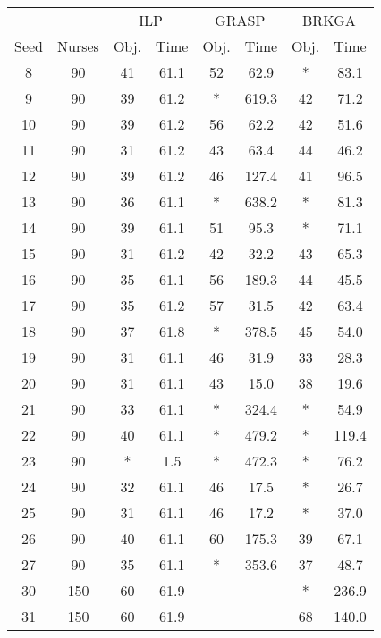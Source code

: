 \documentclass[12pt,a4paper]{article}
\begin{document}
\begin{table}[ht]
\centering
\begin{tabular}{cccccccc}
\toprule
&&\multicolumn{2}{c}{ILP}
& \multicolumn{2}{c}{GRASP}
& \multicolumn{2}{c}{BRKGA} \\
Seed & Nurses & Obj. & Time & Obj. & Time  & Obj. & Time  \\
\midrule
	8  &     90 &  41  & 61.1 &  52  &  62.9 &  *   &  83.1 \\
	9  &     90 &  39  & 61.2 &   *  & 619.3 &  42  &  71.2 \\
	10 &     90 &  39  & 61.2 &  56  &  62.2 &  42  &  51.6 \\
	11 &     90 &  31  & 61.2 &  43  &  63.4 &  44  &  46.2 \\
	12 &     90 &  39  & 61.2 &  46  & 127.4 &  41  &  96.5 \\
	13 &     90 &  36  & 61.1 &   *  & 638.2 &  *   &  81.3 \\
	14 &     90 &  39  & 61.1 &  51  &  95.3 &  *   &  71.1 \\
	15 &     90 &  31  & 61.2 &  42  &  32.2 &  43  &  65.3 \\
	16 &     90 &  35  & 61.1 &  56  & 189.3 &  44  &  45.5 \\
	17 &     90 &  35  & 61.2 &  57  &  31.5 &  42  &  63.4 \\
	18 &     90 &  37  & 61.8 &   *  & 378.5 &  45  &  54.0 \\
	19 &     90 &  31  & 61.1 &  46  &  31.9 &  33  &  28.3 \\
	20 &     90 &  31  & 61.1 &  43  &  15.0 &  38  &  19.6 \\
	21 &     90 &  33  & 61.1 &   *  & 324.4 &   *  &  54.9 \\
	22 &     90 &  40  & 61.1 &   *  & 479.2 &   *  & 119.4 \\
	23 &     90 &   *  &  1.5 &   *  & 472.3 &   *  &  76.2 \\
	24 &     90 &  32  & 61.1 &  46  &  17.5 &   *  &  26.7 \\
	25 &     90 &  31  & 61.1 &  46  &  17.2 &   *  &  37.0 \\
	26 &     90 &  40  & 61.1 &  60  & 175.3 &  39  &  67.1 \\
	27 &     90 &  35  & 61.1 &   *  & 353.6 &  37  &  48.7 \\
\midrule
	30 &    150 &  60  & 61.9 &      &       &   *  & 236.9 \\
	31 &    150 &  60  & 61.9 &      &       &  68  & 140.0 \\

\end{tabular}
\end{table}
\end{document}
